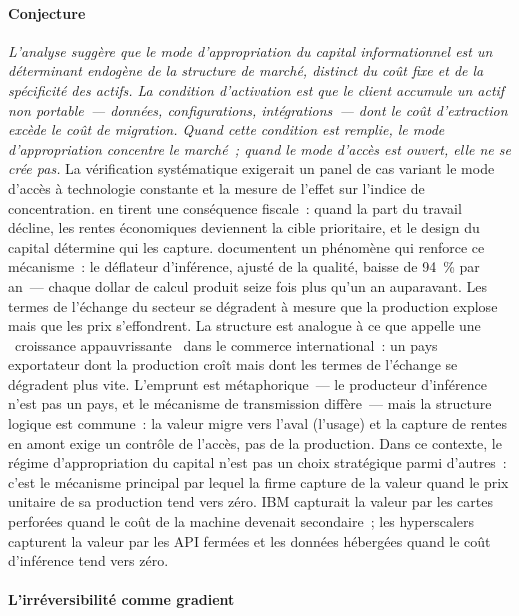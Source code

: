 \paragraph{Conjecture} \emph{L'analyse suggère que le mode d'appropriation du capital informationnel est un déterminant endogène de la structure de marché, distinct du coût fixe et de la spécificité des actifs. La condition d'activation est que le client accumule un actif non portable~--- données, configurations, intégrations~--- dont le coût d'extraction excède le coût de migration. Quand cette condition est remplie, le mode d'appropriation concentre le marché~; quand le mode d'accès est ouvert, elle ne se crée pas.} La vérification systématique exigerait un panel de cas variant le mode d'accès à technologie constante et la mesure de l'effet sur l'indice de concentration. \textcite{korinek_lockwood_2025} en tirent une conséquence fiscale~: quand la part du travail décline, les rentes économiques deviennent la cible prioritaire, et le design du capital détermine qui les capture. \textcite{korinek_mckelvey_2026} documentent un phénomène qui renforce ce mécanisme~: le déflateur d'inférence, ajusté de la qualité, baisse de 94~\% par an~--- chaque dollar de calcul produit seize fois plus qu'un an auparavant. Les termes de l'échange du secteur se dégradent à mesure que la production explose mais que les prix s'effondrent. La structure est analogue à ce que \textcite{bhagwati_immiserizing_1958} appelle une \og~croissance appauvrissante~\fg{} dans le commerce international~: un pays exportateur dont la production croît mais dont les termes de l'échange se dégradent plus vite. L'emprunt est métaphorique~--- le producteur d'inférence n'est pas un pays, et le mécanisme de transmission diffère~--- mais la structure logique est commune~: la valeur migre vers l'aval (l'usage) et la capture de rentes en amont exige un contrôle de l'accès, pas de la production. Dans ce contexte, le régime d'appropriation du capital n'est pas un choix stratégique parmi d'autres~: c'est le mécanisme principal par lequel la firme capture de la valeur quand le prix unitaire de sa production tend vers zéro. IBM capturait la valeur par les cartes perforées quand le coût de la machine devenait secondaire~; les hyperscalers capturent la valeur par les API fermées et les données hébergées quand le coût d'inférence tend vers zéro.


\paragraph{L'irréversibilité comme gradient}

